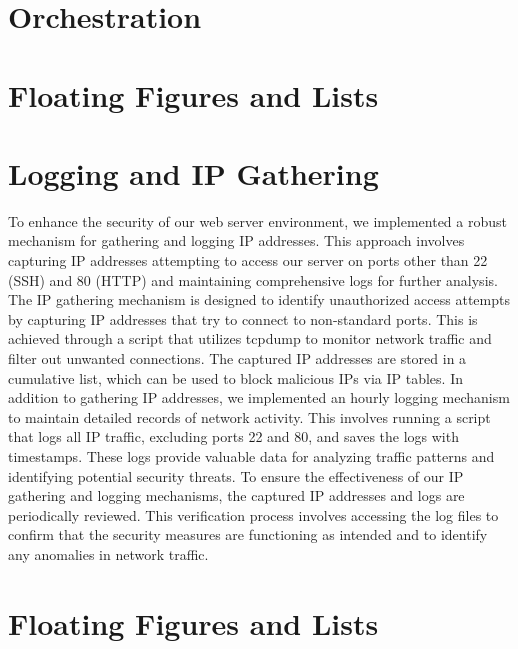 \documentclass[letterpaper,twocolumn,10pt]{article}
\begin{document}
\section{Orchestration}


\section{Floating Figures and Lists}


\section{Logging and IP Gathering}
To enhance the security of our web server environment, we implemented a robust mechanism 
for gathering and logging IP addresses. This approach involves capturing IP addresses 
attempting to access our server on ports other than 22 (SSH) and 80 (HTTP) and maintaining 
comprehensive logs for further analysis. 
The IP gathering mechanism is designed to identify unauthorized access attempts by capturing IP
addresses that try to connect to non-standard ports. This is achieved through a script that utilizes
tcpdump to monitor network traffic and filter out unwanted connections. The captured IP addresses 
are stored in a cumulative list, which can be used to block malicious IPs via IP tables.
In addition to gathering IP addresses, we implemented an hourly logging mechanism to maintain detailed
records of network activity. This involves running a script that logs all IP traffic, excluding ports 22 and 80,
and saves the logs with timestamps. These logs provide valuable data for analyzing traffic patterns and identifying 
potential security threats.
To ensure the effectiveness of our IP gathering and logging mechanisms, the captured IP addresses and logs are periodically 
reviewed. This verification process involves accessing the log files to confirm that the security measures are functioning as 
intended and to identify any anomalies in network traffic.


\section{Floating Figures and Lists}





\end{document}
